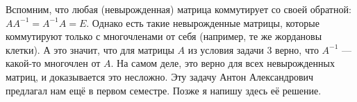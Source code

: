 \begin{remark}
    Вспомним, что любая (невырожденная) матрица коммутирует со своей обратной: $AA^{-1} = A^{-1}A = E$. Однако есть такие невырожденные матрицы, которые коммутируют только с многочленами от себя (например, те же жордановы клетки). А это значит, что для матрицы $A$ из условия задачи 3 верно, что $A^{-1}$ --- какой-то многочлен от $A$. На самом деле, это верно для всех невырожденных матриц, и доказывается это несложно. Эту задачу Антон Александрович предлагал нам ещё в первом семестре. Позже я напишу здесь её решение. %
\end{remark}

